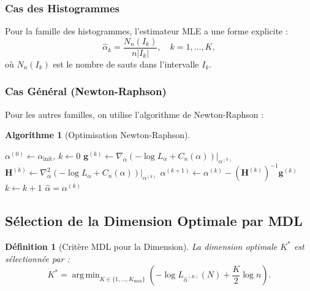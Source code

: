 \documentclass[12pt,a4paper]{article}
\newtheorem{defi}{Définition}[section]
\newtheorem{algo}{Algorithme}[section]
\newcommand{\argmin}{\mathop{\mathrm{arg\,min}}}
\begin{document}
	\subsubsection{Cas des Histogrammes}
	
	Pour la famille des histogrammes, l'estimateur MLE a une forme explicite :
	\begin{equation}
		\hat{\alpha}_k = \frac{N_n(I_k)}{n |I_k|}, \quad k = 1, \dots, K,
	\end{equation}
	où $N_n(I_k)$ est le nombre de sauts dans l'intervalle $I_k$.
	
	\subsubsection{Cas Général (Newton-Raphson)}
	
	Pour les autres familles, on utilise l'algorithme de Newton-Raphson :
	
	\begin{algo}[Optimisation Newton-Raphson]
		\label{algo:newton_raphson}
		\begin{algorithmic}[1]
			\State $\alpha^{(0)} \gets \alpha_{\text{init}}$, $k \gets 0$
			\Repeat
			\State $\mathbf{g}^{(k)} \gets \nabla_{\alpha} \left( -\log L_{\alpha} + C_n(\alpha) \right) \vert_{\alpha^{(k)}}$
			\State $\mathbf{H}^{(k)} \gets \nabla_{\alpha}^2 \left( -\log L_{\alpha} + C_n(\alpha) \right) \vert_{\alpha^{(k)}}$
			\State $\alpha^{(k+1)} \gets \alpha^{(k)} - (\mathbf{H}^{(k)})^{-1} \mathbf{g}^{(k)}$
			\State $k \gets k + 1$
			\State \Return $\hat{\alpha} = \alpha^{(k)}$
			\EndProcedure
		\end{algorithmic}
	\end{algo}
	
	\subsection{Sélection de la Dimension Optimale par MDL}
	\label{subsec:selection_dimension}
	
	\begin{defi}[Critère MDL pour la Dimension]
		\label{def:critere_mdl}
		La dimension optimale $K^*$ est sélectionnée par :
		\begin{equation}
			K^* = \argmin_{K \in \{1, \dots, K_{\text{max}}\}} \left( -\log L_{\hat{\alpha}^{(K)}}(N) + \frac{K}{2} \log n \right).
		\end{equation}
	\end{defi}
	
\end{document}
